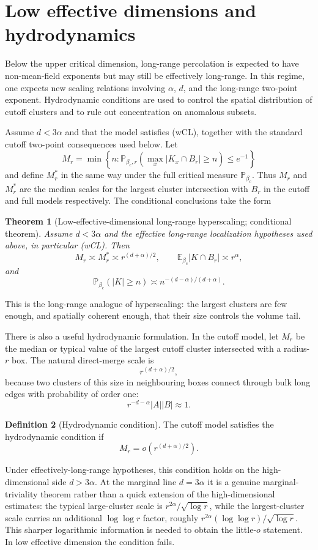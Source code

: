 \documentclass[11pt,reqno]{book}
\numberwithin{equation}{chapter}
\theoremstyle{plain}
\newtheorem{theorem}{Theorem}[chapter]
\theoremstyle{definition}
\newtheorem{defn}[theorem]{Definition}
\theoremstyle{remark}
\renewcommand{\P}{\mathbb P}
\newcommand{\1}{\mathbf 1}
\begin{document}
\section{Low effective dimensions and hydrodynamics}

Below the upper critical dimension, long-range percolation is expected to have non-mean-field exponents but may still be effectively long-range. In this regime, one expects new scaling relations involving $\alpha$, $d$, and the long-range two-point exponent. Hydrodynamic conditions are used to control the spatial distribution of cutoff clusters and to rule out concentration on anomalous subsets.

Assume \(d<3\alpha\) and that the model satisfies (wCL), together with the
standard cutoff two-point consequences used below. Let
\[
  M_r=
  \min\left\{n:
  \P_{\beta_c,r}\!\left(
    \max_x |K_x\cap B_r|\geq n
  \right)\leq e^{-1}\right\}
\]
and define \(M_r^*\) in the same way under the full critical measure \(\P_{\beta_c}\). Thus \(M_r\) and \(M_r^*\) are the median scales for the largest cluster intersection with \(B_r\) in the cutoff and full models respectively. The conditional conclusions take the form
\begin{theorem}[Low-effective-dimensional long-range hyperscaling; conditional theorem]
Assume \(d<3\alpha\) and the effective long-range localization hypotheses
used above, in particular (wCL). Then
\[
  M_r\asymp M_r^*\asymp r^{(d+\alpha)/2},
  \qquad
  \mathbb E_{\beta_c}|K\cap B_r|\asymp r^\alpha,
\]
and
\[
  \mathbb P_{\beta_c}(|K|\geq n)
  \asymp
  n^{-(d-\alpha)/(d+\alpha)}.
\]
\end{theorem}

This is the long-range analogue of hyperscaling: the largest clusters are few enough, and spatially coherent enough, that their size controls the volume tail.

There is also a useful hydrodynamic formulation. In the cutoff model, let $M_r$ be the median or typical value of the largest cutoff cluster intersected with a radius-$r$ box. The natural direct-merge scale is
\[
  r^{(d+\alpha)/2},
\]
because two clusters of this size in neighbouring boxes connect through bulk long edges with probability of order one:
\[
  r^{-d-\alpha}|A||B|\approx 1.
\]
\begin{defn}[Hydrodynamic condition]
The cutoff model satisfies the hydrodynamic condition if
\[
  M_r=o(r^{(d+\alpha)/2}).
\]
\end{defn}

Under effectively-long-range hypotheses, this condition holds on the
high-dimensional side \(d>3\alpha\). At the marginal line \(d=3\alpha\) it is
a genuine marginal-triviality theorem rather than a quick extension of the
high-dimensional estimates: the typical large-cluster scale is
\(r^{2\alpha}/\sqrt{\log r}\), while the largest-cluster scale carries an
additional \(\log\log r\) factor, roughly
\(r^{2\alpha}(\log\log r)/\sqrt{\log r}\). This sharper logarithmic
information is needed to obtain the little-\(o\) statement. In low effective
dimension the condition fails.
\end{document}
